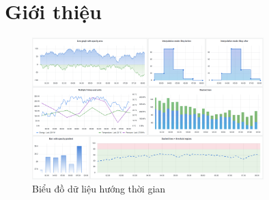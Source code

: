 \chapter{Giới thiệu}
\begin{figure}[H] %
  \centering %
  \includegraphics[width=0.8\textwidth]{figures/time_series_light_theme_sized.png} 
  \caption{Biểu đồ dữ liệu hướng thời gian} %
  \label{fig:fig_01}
\end{figure}
